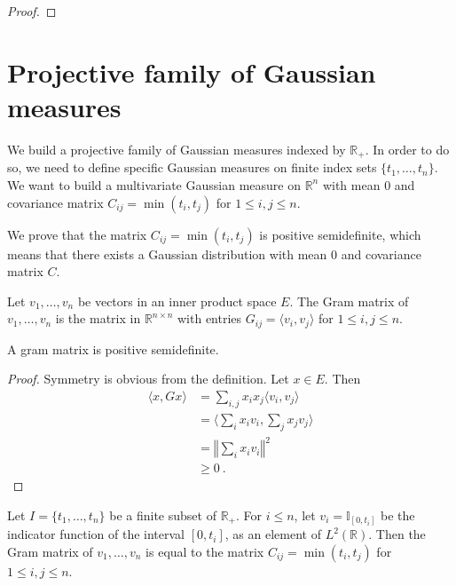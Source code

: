 \begin{proof}\mathlibok

\end{proof}


\section{Projective family of Gaussian measures}

We build a projective family of Gaussian measures indexed by $\mathbb{R}_+$.
In order to do so, we need to define specific Gaussian measures on finite index sets $\{t_1, \ldots, t_n\}$.
We want to build a multivariate Gaussian measure on $\mathbb{R}^n$ with mean $0$ and covariance matrix $C_{ij} = \min(t_i, t_j)$ for $1 \leq i,j \leq n$.

We prove that the matrix $C_{ij} = \min(t_i, t_j)$ is positive semidefinite, which means that there exists a Gaussian distribution with mean 0 and covariance matrix $C$.

\begin{definition}\label{def:gramMatrix}
  \mathlibok
Let $v_1, \ldots, v_n$ be vectors in an inner product space $E$.
The Gram matrix of $v_1, \ldots, v_n$ is the matrix in $\mathbb{R}^{n \times n}$ with entries $G_{ij} = \langle v_i, v_j \rangle$ for $1 \leq i,j \leq n$.
\end{definition}


\begin{lemma}\label{lem:posSemidef_gramMatrix}
  \mathlibok
A gram matrix is positive semidefinite.
\end{lemma}

\begin{proof}\leanok
Symmetry is obvious from the definition.
Let $x \in E$. Then
\begin{align*}
  \langle x, G x \rangle
  &= \sum_{i,j} x_i x_j \langle v_i, v_j \rangle
  \\
  &= \langle \sum_i x_i v_i, \sum_j x_j v_j \rangle
  \\
  &= \left\Vert \sum_i x_i v_i \right\Vert^2
  \\
  &\ge 0
  \: .
\end{align*}
\end{proof}


\begin{lemma}\label{lem:C_eq_gramMatrix}
  \leanok
Let $I = \{t_1, \ldots, t_n\}$ be a finite subset of $\mathbb{R}_+$.
For $i \le n$, let $v_i = \mathbb{I}_{[0, t_i]}$ be the indicator function of the interval $[0, t_i]$, as an element of $L^2(\mathbb{R})$.
Then the Gram matrix of $v_1, \ldots, v_n$ is equal to the matrix $C_{ij} = \min(t_i, t_j)$ for $1 \leq i,j \leq n$.
\end{lemma}

